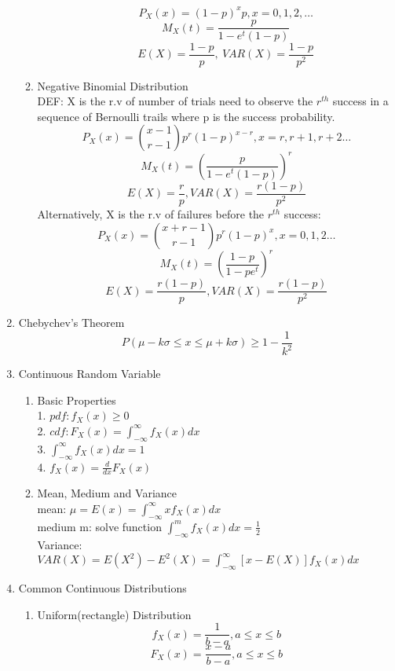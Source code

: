 \documentclass[10pt]{article}
\begin{document}
\begin{multicols}{2}
\begin{enumerate}
\begin{enumerate}
\begin{enumerate}
					$$P_X(x) = (1-p)^xp, x = 0,1,2,\dots$$
					$$M_X(t) = \frac{p}{1-e^t(1-p)}$$
					$$E(X) = \frac{1-p}{p}, \ VAR(X) = \frac{1-p}{p^2}$$
				\end{enumerate}
				\item Negative Binomial Distribution\\
					DEF: X is the r.v of number of trials need to observe the $r^{th}$ success in a sequence of Bernoulli trails where p is the success probability.\\
					$$P_X(x) = {x-1 \choose r-1}p^r(1-p)^{x-r}, x = r,r+1,r+2 \dots$$
					$$M_X(t) = (\frac{p}{1-e^t(1-p)})^r$$
					$$E(X) = \frac{r}{p}, VAR(X) = \frac{r(1-p)}{p^2}$$
					Alternatively, X is the r.v of failures before the $r^{th}$ success:\\
					$$P_X(x) = {x+r-1 \choose r-1}p^r(1-p)^x, x = 0,1,2 \dots$$
					$$M_X(t) = (\frac{1-p}{1-pe^t})^r$$
					$$E(X) = \frac{r(1-p)}{p}, VAR(X) = \frac{r(1-p)}{p^2}$$
			\end{enumerate}
			\item Chebychev's Theorem\\
			$$P(\mu-k\sigma \le x \le \mu+k\sigma) \ge 1-\frac{1}{k^2}$$
			\item Continuous Random Variable
			\begin{enumerate}
				\item Basic Properties\\
				1. $pdf: f_X(x) \ge 0$\\
				2. $cdf: F_X(x) = \int_{-\infty}^{\infty} f_X(x)dx$\\
				3. $\int_{-\infty}^{\infty}f_X(x)dx = 1$\\
				4. $f_X(x) = \frac{d}{dx}F_X(x)$
				\item Mean, Medium and Variance\\
				mean: $\mu = E(x) = \int_{-\infty}^{\infty}xf_X(x)dx$\\
				medium m: solve function $\int_{-\infty}^{m} f_X(x)dx = \frac{1}{2}$\\
				Variance: \\
				$VAR(X) = E(X^2) - E^2(X) = \int_{-\infty}^{\infty}[x-E(X)]f_X(x)dx$
			\end{enumerate}
			\item Common Continuous Distributions
			\begin{enumerate}
				\item Uniform(rectangle) Distribution\\
				$$f_X(x) = \frac{1}{b-a}, a \le x \le b$$
				$$F_X(x) = \frac{x-a}{b-a}, a\le x \le b$$

\end{enumerate}
\end{enumerate}
\end{multicols}
\end{document}
